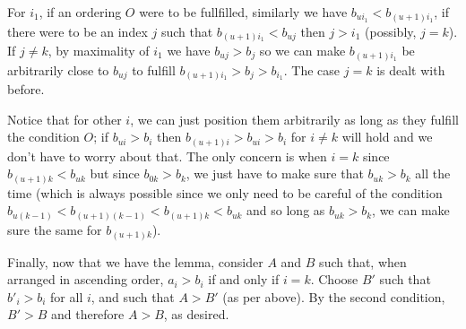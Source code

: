 \documentclass[11pt,a4paper]{article}
\begin{document}
\begin{enumerate}
	 For $i_1$, if an ordering $O$ were to be fullfilled, similarly we have $b_{ui_1}<b_{(u+1)i_1}$, if there were to be an index $j$ such that $b_{(u+1)i_1}<b_{uj}$ then $j>i_1$ (possibly, $j=k$). If $j\neq k$, by maximality of $i_1$ we have $b_{uj}>b_j$ so we can make $b_{(u+1)i_1}$ be arbitrarily close to $b_{uj}$ to fulfill $b_{(u+1)i_1}>b_j>b_{i_1}$. The case $j=k$ is dealt with before. 
	 
	 Notice that for other $i$, we can just position them arbitrarily as long as they fulfill the condition $O$; if $b_{ui}>b_i$ then $b_{(u+1)i}>b_{ui}>b_i$ for $i\neq k$ will hold and we don't have to worry about that. The only concern is when $i=k$ since $b_{(u+1)k}<b_{uk}$ but since $b_{0k}>b_k$, we just have to make sure that $b_{uk}>b_{k}$ all the time (which is always possible since we only need to be careful of the condition $b_{u(k-1)} < b_{(u+1)(k-1)} < b_{(u+1)k} < b_{uk}$ and so long as $b_{uk} > b_k$, we can make sure the same for $b_{(u+1)k}$). 
	 
	 Finally, now that we have the lemma, consider $A$ and $B$ such that, when arranged in ascending order, $a_i>b_i$ if and only if $i=k$. Choose $B'$ such that $b'_i>b_i$ for all $i$, and such that $A>B'$ (as per above). By the second condition, $B'>B$ and therefore $A>B$, as desired. 
\end{enumerate}
\end{document}
